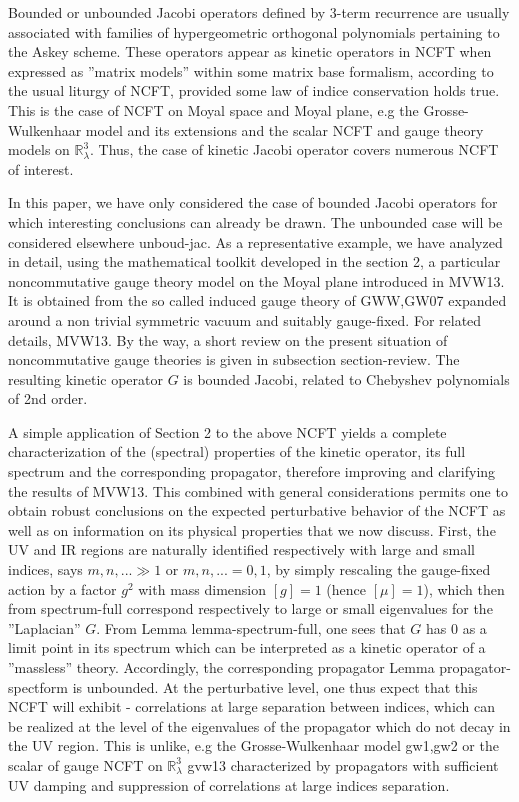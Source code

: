 \documentclass[10pt]{book}
\theoremstyle{break}
\begin{document}
Bounded or unbounded Jacobi operators defined by 3-term recurrence are usually associated with families of hypergeometric orthogonal polynomials pertaining to the Askey scheme. These operators appear as kinetic operators in NCFT when expressed as ''matrix models'' within some matrix base formalism, according to the usual liturgy of NCFT, provided some law of indice conservation holds true. This is the case of NCFT on Moyal space and Moyal plane, e.g the Grosse-Wulkenhaar model and its extensions and the scalar NCFT and gauge theory models on $\mathbb{R}^3_\lambda$. Thus, the case of kinetic Jacobi operator covers numerous NCFT of interest. \par
In this paper, we have only considered the case of bounded Jacobi operators for which interesting conclusions can already be drawn. The unbounded case will be considered elsewhere {unboud-jac}. As a representative example, we have analyzed in detail, using the mathematical toolkit developed in the section 2, a particular noncommutative gauge theory model on the Moyal plane introduced in {MVW13}. It is obtained from the so called induced gauge theory of {GWW,GW07} expanded around a non trivial symmetric vacuum and suitably gauge-fixed. For related details, {MVW13}. By the way, a short review on the present situation of noncommutative gauge theories is given in subsection {section-review}. The resulting kinetic operator $G$ is bounded Jacobi, related to Chebyshev polynomials of 2nd order.\par 
A simple application of Section 2 to the above NCFT yields a complete characterization of the (spectral) properties of the kinetic operator, its full spectrum and the corresponding propagator, therefore improving and clarifying the results of {MVW13}. This combined with general considerations permits one to obtain robust conclusions on the expected perturbative behavior of the NCFT as well as on information on its physical properties that we now discuss. First, the UV and IR regions are naturally identified respectively with large and small indices, says $m,n,...\gg 1$ or $m,n,... =0,1$, by simply rescaling the gauge-fixed action by a factor $g^2$ with mass dimension $[g]=1$ (hence $[\mu]=1$), which then from {spectrum-full} correspond respectively to large or small eigenvalues for the ''Laplacian'' $G$.
From Lemma {lemma-spectrum-full}, one sees that $G$ has $0$ as a limit point in its spectrum which can be interpreted as a kinetic operator of a ''massless'' theory. Accordingly, the corresponding propagator Lemma {propagator-spectform} is unbounded. At the perturbative level, one thus expect that this NCFT will exhibit - correlations at large separation between indices, which can be realized at the level of the eigenvalues of the propagator which do not decay in the UV region. This is unlike, e.g the Grosse-Wulkenhaar model {gw1,gw2} or the scalar of gauge NCFT on $\mathbb{R}^3_\lambda$ {gvw13} characterized by propagators with sufficient UV damping and suppression of correlations at large indices separation.\par
\end{document}
